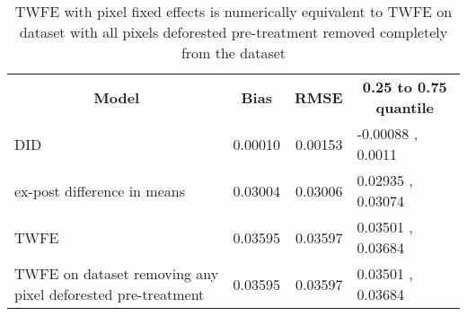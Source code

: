 \begin{table}[H]

\caption{\label{tab:twfe-comp}TWFE with pixel fixed effects is numerically equivalent to TWFE on dataset with all pixels deforested pre-treatment removed completely from the dataset}
\centering
\fontsize{10}{12}\selectfont
\begin{tabular}[t]{lrrl}
\toprule
\multicolumn{1}{c}{\textbf{Model}} & \multicolumn{1}{c}{\textbf{Bias}} & \multicolumn{1}{c}{\textbf{RMSE}} & \multicolumn{1}{c}{\textbf{0.25 to 0.75 quantile}} \\
\cmidrule(l{3pt}r{3pt}){1-1} \cmidrule(l{3pt}r{3pt}){2-2} \cmidrule(l{3pt}r{3pt}){3-3} \cmidrule(l{3pt}r{3pt}){4-4}
DID & 0.00010 & 0.00153 & -0.00088 , 0.0011\\
ex-post difference in means & 0.03004 & 0.03006 & 0.02935 , 0.03074\\
TWFE & 0.03595 & 0.03597 & 0.03501 , 0.03684\\
TWFE on dataset removing any pixel deforested pre-treatment & 0.03595 & 0.03597 & 0.03501 , 0.03684\\
\bottomrule
\end{tabular}
\end{table}
